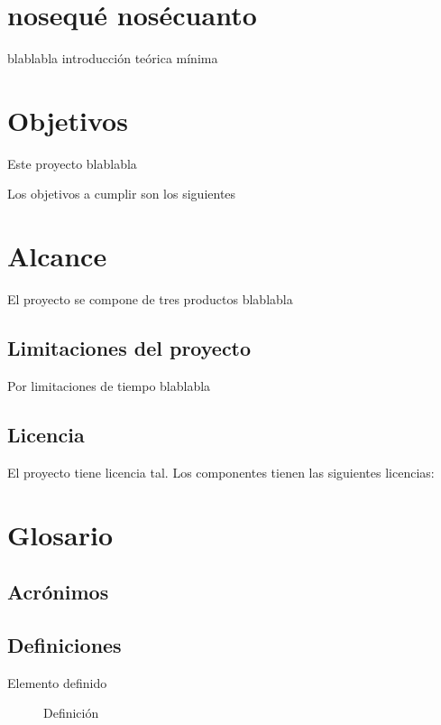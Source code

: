 \section{nosequé nosécuanto}
blablabla introducción teórica mínima

\section{Objetivos}

Este proyecto blablabla

Los objetivos a cumplir son los siguientes

\section{Alcance}

El proyecto se compone de tres productos blablabla

\subsection{Limitaciones del proyecto}

Por limitaciones de tiempo blablabla

\subsection{Licencia}

El proyecto tiene licencia tal. Los componentes tienen las siguientes licencias:

\section{Glosario}

\subsection{Acrónimos}



\subsection{Definiciones}

\begin{description}
\item[Elemento definido] 
  Definición
\end{description}